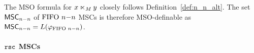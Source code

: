 The MSO formula for $x \ltimes_M y$ closely follows Definition~\ref{def:n_n_alt}. The set $\mathsf{MSC}_{n\mathsf{-}n}$ of $\text{FIFO } n\mathsf{-}n$ MSCs is therefore MSO-definable as $\mathsf{MSC}_{n\mathsf{-}n}=L(\varphi_{\text{FIFO } n\mathsf{-}n})$.

\paragraph*{$\mathtt{rsc}$ MSCs}

